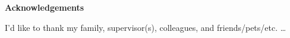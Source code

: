 \begin{center}
	{\huge\bf{Acknowledgements}}
	
	\vspace{1cm}
\end{center}


I'd like to thank my family, supervisor(s), colleagues, and friends/pets/etc. \ldots




